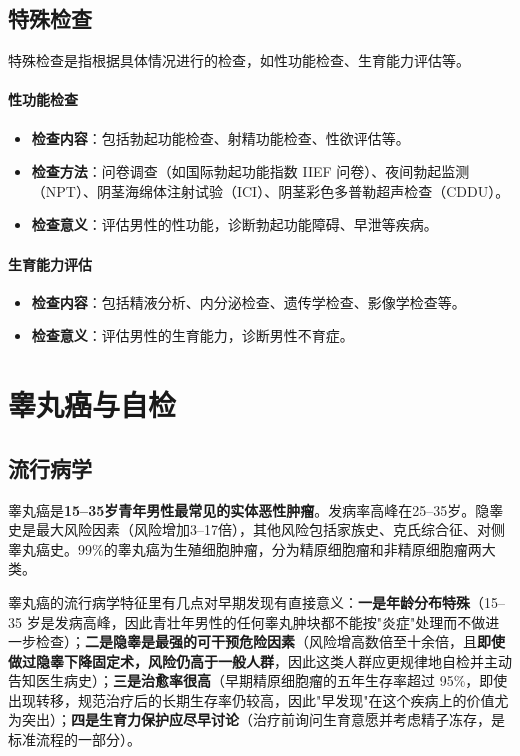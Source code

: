\documentclass[12pt,a4paper,twoside]{ctexbook}
\begin{document}
\subsection{特殊检查}

特殊检查是指根据具体情况进行的检查，如性功能检查、生育能力评估等。

\paragraph{性功能检查}
\begin{itemize}
\item \textbf{检查内容}：包括勃起功能检查、射精功能检查、性欲评估等。
\item \textbf{检查方法}：问卷调查（如国际勃起功能指数 IIEF 问卷）、夜间勃起监测（NPT）、阴茎海绵体注射试验（ICI）、阴茎彩色多普勒超声检查（CDDU）。
\item \textbf{检查意义}：评估男性的性功能，诊断勃起功能障碍、早泄等疾病。
\end{itemize}

\paragraph{生育能力评估}
\begin{itemize}
\item \textbf{检查内容}：包括精液分析、内分泌检查、遗传学检查、影像学检查等。
\item \textbf{检查意义}：评估男性的生育能力，诊断男性不育症。
\end{itemize}

\section{睾丸癌与自检}


\label{sec:testicular_cancer}

\subsection{流行病学}

睾丸癌是\textbf{15--35岁青年男性最常见的实体恶性肿瘤}。发病率高峰在25--35岁。隐睾史是最大风险因素（风险增加3--17倍），其他风险包括家族史、克氏综合征、对侧睾丸癌史。99\%的睾丸癌为生殖细胞肿瘤，分为精原细胞瘤和非精原细胞瘤两大类。


睾丸癌的流行病学特征里有几点对早期发现有直接意义：\textbf{一是年龄分布特殊}（15--35 岁是发病高峰，因此青壮年男性的任何睾丸肿块都不能按"炎症"处理而不做进一步检查）；\textbf{二是隐睾是最强的可干预危险因素}（风险增高数倍至十余倍，且\textbf{即使做过隐睾下降固定术，风险仍高于一般人群}，因此这类人群应更规律地自检并主动告知医生病史）；\textbf{三是治愈率很高}（早期精原细胞瘤的五年生存率超过 95\%，即使出现转移，规范治疗后的长期生存率仍较高，因此"早发现"在这个疾病上的价值尤为突出）；\textbf{四是生育力保护应尽早讨论}（治疗前询问生育意愿并考虑精子冻存，是标准流程的一部分）。
\end{document}
